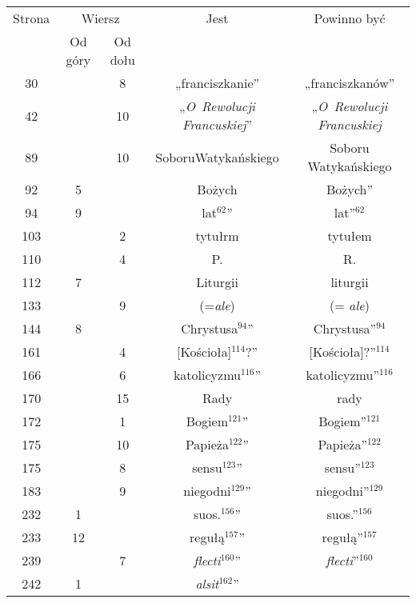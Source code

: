 \documentclass[a4paper,11pt]{article}
\begin{document}
\begin{center}

  \begin{tabular}{|c|c|c|c|c|}
    \hline
    Strona & \multicolumn{2}{c|}{Wiersz} & Jest
                              & Powinno być \\ \cline{2-3}
    & Od góry & Od dołu & & \\
    \hline
    \hphantom{0}30 & & \hphantom{0}8 & „franciszkanie” & „franciszkanów” \\
    \hphantom{0}42 & & 10 & „\textit{O~Rewolucji Francuskiej}”
    & „\textit{O~Rewolucji Francuskiej} \\
    \hphantom{0}89 & & 10 & SoboruWatykańskiego & Soboru Watykańskiego \\
    \hphantom{0}92 & \hphantom{0}5 & & Bożych & Bożych” \\
    \hphantom{0}94 & \hphantom{0}9 & & lat$^{ 62 }$” & lat”$^{ 62 }$ \\
    103 & & \hphantom{0}2 & tytułrm & tytułem \\
    110 & & \hphantom{0}4 & P. & R. \\
    112 & \hphantom{0}7 & & Liturgii & liturgii \\
    133 & & \hphantom{0}9 & (=\textit{ale}) & (= \textit{ale}) \\
    144 & \hphantom{0}8 & & Chrystusa$^{ 94 }$” & Chrystusa”$^{ 94 }$\\
    161 & & \hphantom{0}4 & [Kościoła]$^{ 114 }$?” & [Kościoła]?”$^{ 114 }$ \\
    166 & & \hphantom{0}6 & katolicyzmu$^{ 116 }$” & katolicyzmu”$^{ 116 }$ \\
    170 & & 15 & Rady & rady \\
    172 & & \hphantom{0}1 & Bogiem$^{ 121 }$” & Bogiem”$^{ 121 }$ \\
    175 & & 10 & Papieża$^{ 122 }$” & Papieża”$^{ 122 }$ \\
    175 & & \hphantom{0}8 & sensu$^{ 123 }$” & sensu”$^{ 123 }$ \\
    183 & & \hphantom{0}9 & niegodni$^{ 129 }$” & niegodni”$^{ 129 }$ \\
    232 & \hphantom{0}1 & & suos.$^{ 156 }$” & suos.”$^{ 156 }$ \\
    233 & 12 & & regułą$^{ 157 }$” & regułą”$^{ 157 }$ \\
    239 & & \hphantom{0}7 & \textit{flecti}$^{ 160 }$”
    & \textit{flecti}”$^{ 160 }$ \\
    242 & \hphantom{0}1 & & \textit{alsit}$^{ 162 }$”

\end{tabular}
\end{center}
\end{document}
